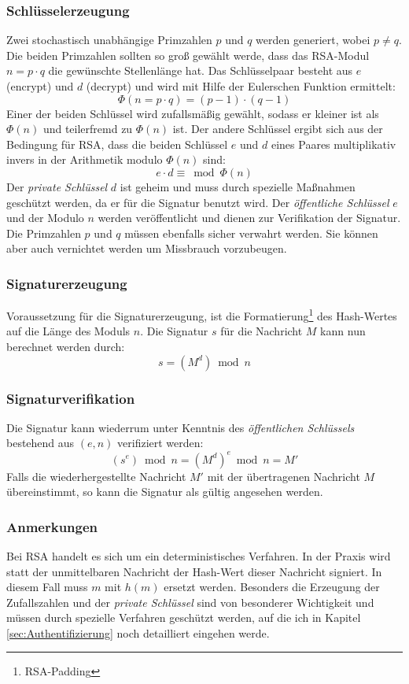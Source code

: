 \documentclass[11pt,a4paper,ngerman]{scrreprt}
\begin{document}
\subsubsection{Schlüsselerzeugung}
Zwei stochastisch unabhängige Primzahlen $p$ und $q$ werden generiert, wobei $p \neq q$. Die beiden Primzahlen sollten so groß gewählt werde, dass das RSA-Modul $n=p \cdot q$ die gewünschte Stellenlänge hat. Das Schlüsselpaar besteht aus $e$ (encrypt) und $d$ (decrypt) und wird mit Hilfe der Eulerschen Funktion ermittelt:
\[
    \Phi(n = p \cdot q) = (p-1) \cdot (q-1)
\]
Einer der beiden Schlüssel wird zufallsmäßig gewählt, sodass er kleiner ist als $\Phi(n)$ und teilerfremd zu $\Phi(n)$ ist. Der andere Schlüssel ergibt sich aus der Bedingung für RSA, dass die beiden Schlüssel $e$ und $d$ eines Paares multiplikativ invers in der Arithmetik modulo $\Phi(n)$ sind:
\[
    e \cdot d \equiv \bmod \Phi(n) 
\]
Der \emph{private Schlüssel} $d$ ist geheim und muss durch spezielle Maßnahmen geschützt werden, da er für die Signatur benutzt wird. Der \emph{öffentliche Schlüssel} $e$ und der Modulo $n$ werden veröffentlicht und dienen zur Verifikation der Signatur. Die Primzahlen $p$ und $q$ müssen ebenfalls sicher verwahrt werden. Sie können aber auch vernichtet werden um Missbrauch vorzubeugen.
\subsubsection{Signaturerzeugung}
Voraussetzung für die Signaturerzeugung, ist die Formatierung\footnote{RSA-Padding} des Hash-Wertes auf die Länge des Moduls $n$. Die Signatur $s$ für die Nachricht $M$ kann nun berechnet werden durch:
\[
    s = (M^d) \bmod n    
\]
\subsubsection{Signaturverifikation}
Die Signatur kann wiederrum unter Kenntnis des \emph{öffentlichen Schlüssels} bestehend aus $(e, n)$ verifiziert werden:
\[
    (s^e) \bmod n = (M^d)^e \bmod n = M'
\]
Falls die wiederhergestellte Nachricht $M'$ mit der übertragenen Nachricht $M$ übereinstimmt, so kann die Signatur als gültig angesehen werden.
\subsubsection{Anmerkungen}
Bei RSA handelt es sich um ein deterministisches Verfahren. In der Praxis wird statt der unmittelbaren Nachricht der Hash-Wert dieser Nachricht signiert. In diesem Fall muss $m$ mit $h(m)$ ersetzt werden. Besonders die Erzeugung der Zufallszahlen und der \emph{private Schlüssel} sind von besonderer Wichtigkeit und müssen durch spezielle Verfahren geschützt werden, auf die ich in Kapitel \ref{sec:Authentifizierung} noch detailliert eingehen werde.
\end{document}
